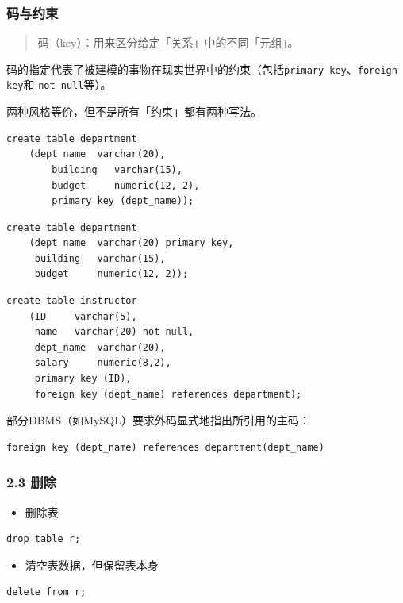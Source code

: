 \documentclass[aspectratio=169, 14pt]{beamer}
\begin{document}
\begin{frame}
    \frametitle{码与约束}
\begin{quote}
    码（key）：用来区分给定「关系」中的不同「元组」。
\end{quote}
码的指定代表了被建模的事物在现实世界中的\alert{约束}（包括\texttt{primary key}、\texttt{foreign key}和
\texttt{not null}等）。

\end{frame}

\begin{frame}[fragile]
    两种风格等价，但不是所有「约束」都有两种写法。

    \begin{verbatim}
create table department
    (dept_name  varchar(20),
        building   varchar(15),
        budget     numeric(12, 2),
        primary key (dept_name)); 
    \end{verbatim}

        \begin{verbatim}
create table department
    (dept_name  varchar(20) primary key,
     building   varchar(15),
     budget     numeric(12, 2)); 
        \end{verbatim} 

\end{frame}

\begin{frame}[fragile]
    \begin{verbatim}
create table instructor
    (ID     varchar(5), 
     name   varchar(20) not null, 
     dept_name  varchar(20),
     salary     numeric(8,2),
     primary key (ID),
     foreign key (dept_name) references department);
    \end{verbatim} 
\pause
部分DBMS（如MySQL）要求外码显式地指出所引用的主码：
\begin{verbatim}
foreign key (dept_name) references department(dept_name)
\end{verbatim}
\end{frame}

\begin{frame}[fragile]
    \frametitle{2.3 删除}
\begin{itemize}
    \item 删除表
\end{itemize}    
\begin{verbatim}
drop table r;
\end{verbatim}

\begin{itemize}
    \item 清空表数据，但保留表本身
\end{itemize}  
\begin{verbatim}
delete from r;
\end{verbatim}
\end{frame}
\end{document}
